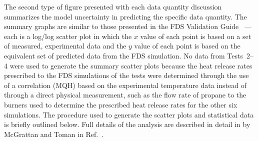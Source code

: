 The second type of figure presented with each data quantity discussion summarizes the model uncertainty in predicting the specific data quantity. The summary graphs are similar to those presented in the FDS Validation Guide~\cite{FDS_Validation_Guide} --- each is a log/log scatter plot in which the $x$ value of each point is based on a set of measured, experimental data and the $y$ value of each point is based on the equivalent set of predicted data from the FDS simulation. No data from Tests~2--4 were used to generate the summary scatter plots because the heat release rates prescribed to the FDS simulations of the tests were determined through the use of a correlation (MQH) based on the experimental temperature data instead of through a direct physical measurement, such as the flow rate of propane to the burners used to determine the prescribed heat release rates for the other six simulations. The procedure used to generate the scatter plots and statistical data is briefly outlined below. Full details of the analysis are described in detail in by McGrattan and Toman in Ref.~\cite{McGrattan:Metrologia}.

